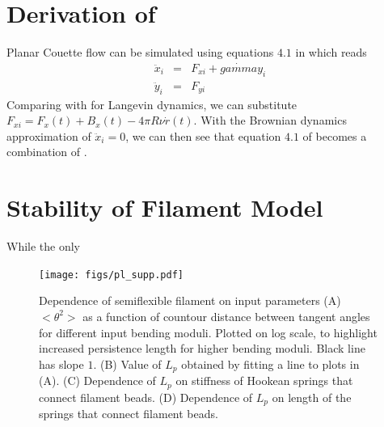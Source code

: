 \documentclass[12pt]{article}
\begin{document}
\section{Derivation of }
Planar Couette flow can be simulated using equations $4.1$ in 
\cite{evans1984} which reads
\begin{eqnarray}
  \ddot{x}_i&=&F_{xi}+\dot{gamma}y_i\\\nonumber
  \ddot{y}_i&=&F_{yi}\nonumber
  \label{eqn:evans_full}
\end{eqnarray}
Comparing with  for Langevin dynamics, we can substitute 
$F_{xi} = F_x(t) + B_x(t) - 4\pi R\nu\dot{r}(t)$. With the Brownian dynamics
approximation of $\ddot{x}_i=0$, we can then see that equation $4.1$ of 
\cite{evans1984} becomes a combination of . 
\section{Stability of Filament Model}
While the only 
\begin{figure}[H]
  \centering
  \texttt{[image: figs/pl\_supp.pdf]}
  \caption{Dependence of semiflexible filament on input parameters 
  (A) $<\theta^2>$ as a function of countour distance between tangent angles for
  different input bending moduli. Plotted on log scale, to highlight increased 
  persistence length for higher bending moduli. Black line has slope $1$.
 (B) Value of $L_p$ obtained by fitting a line to plots in (A).
 (C) Dependence of $L_p$ on stiffness of Hookean springs that connect
 filament beads. 
 (D) Dependence of $L_p$ on length of the springs that connect filament beads. 
 }
  \label{fig:pl_supp}
\end{figure}
\end{document}
